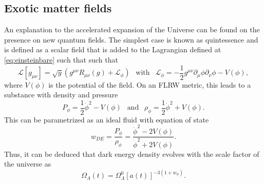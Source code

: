 \subsection{Exotic matter fields}
An explanation to the accelerated expansion of the Universe can be found on the presence on new quantum fields. The simplest case is known as quintessence and is defined as a scalar field that is added to the Lagrangian defined at \autoref{eq:einsteinbare} such that such that
\begin{equation}
\mathcal{L}[g_{\mu\nu}] = \sqrt{g}\left(g^{\mu\nu}R_{\mu\nu}(g)+\mathcal{L}_\phi\right)\ \ \mbox{ with }\ \ \mathcal{L}_\phi = -\frac{1}{2}g^{\mu\nu}\partial_\mu\phi\partial_\nu\phi-V(\phi),
\end{equation}
where $V(\phi)$ is the potential of the field. On an FLRW metric, this leads to a substance with density and pressure 
\begin{equation}
P_\phi = \frac{1}{2}\dot\phi^2-V(\phi)\ \ \mbox{ and }\ \ \rho_\phi=\frac{1}{2}\dot\phi^2+V(\phi).
\end{equation}
This can be parametrized as an ideal fluid with equation of state
\begin{equation}
w_{DE} = \frac{P_\phi}{\rho_\phi} = \frac{\dot\phi^2-2V(\phi)}{\dot\phi^2+2V(\phi)}.
\end{equation}
Thus, it can be deduced that dark energy density evolves with the scale factor of the universe as
\begin{equation}
\Omega_\Lambda(t) = \Omega_\Lambda^0 [a(t)]^{-3(1+w_\phi)}.
\end{equation}
\newline

